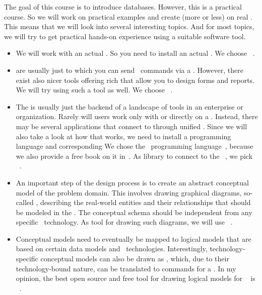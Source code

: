 %
%
%
The goal of this course is to introduce databases.
However, this is a practical course.
So we will work on practical examples and create (more or less)   on real .
This means that we will look into several interesting topics.
And for most topics, we will try to get practical hands-on experience using a suitable software tool.%
%
\begin{itemize}%
%
\item We will work with an actual .
So you need to install an actual .
We choose \postgresql~\cite{TA2024DDAMWPAM,FP2023LP,OH2017PUAR,B2024PELUYDW}.%
%
\item {} are usually just  to which you can send \sql\ commands via a  .
However, there exist also nicer tools offering rich  that allow you to design forms and reports.
We will try using such a tool as well.
We choose \libreofficeBase~\cite{FNFHWSKLSSGLFRSRPLJG2022BG7R1BOL7C,S2022L7PFEUU}.%
%
\item The  is usually just the backend of a landscape of tools in an enterprise or organization.
Rarely will users work only with or directly on a .
Instead, there may be several applications that connect to  through unified .
Since we will also take a look at how that works, we need to install a programming language and corresponding 
We chose the \python\ programming language~\cite{K2018EIPFEUU,A2002PC,H2023ABGTP3P,LH2015DSAAWP}, because we also provide a free book on it in~\cite{programmingWithPython}.
As library to connect to the \postgresql\ , we pick \psycopg~\cite{VDGE2010P}.%
%
\item An important step of the  design process is to create an abstract conceptual model of the problem domain.
This involves drawing graphical diagrams, so-called , describing the real-world entities and their relationships that should be modeled in the \db.
The conceptual schema should be independent from any specific \dbms\ technology.
As tool for drawing such diagrams, we will use \yEd~\cite{SG2015MDAWY,Y2011YGEM}.%
%
\item Conceptual models need to eventually be mapped to logical models that are based on certain data models and \db\ technologies.
Interestingly, technology-specific conceptual models can also be drawn as , which, due to their technology-bound nature, can be translated to commands for a \dbms.
In my opinion, the best open source and free tool for drawing logical models for \postgresql\  is \pgmodeler~\cite{AES2006PPDM}.%
%
\end{itemize}%
